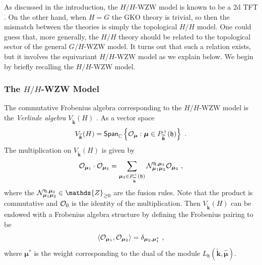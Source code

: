 \documentclass[a4paper,11pt]{article}
\newcommand{\bk}{\bm{k}}
\newcommand{\bmu}{\bm{\mu}}
\newcommand{\hbmu}{\hat{\bm{\mu}}}
\newcommand{\tsf}[1]{\textsf{#1}}
\newcommand{\wt}[1]{\widetilde{#1}}
\def\CN {{\cal N}}
\def\CO {{\cal O}}
\def\CO {{\cal O}}
\def\fh{\mathfrak{h}}
\begin{document}
As discussed in the introduction, the $H/H$-\tsf{WZW} model is known to be a 2d \tsf{TFT} 
\cite{SPIEGELGLAS199036,Spiegelglas:1991uc,Spiegelglas:1992jg,Witten:1991mm,Witten:1993xi}.
On the other hand, when $H=G$ the \tsf{GKO} theory is trivial, so then the mismatch between the 
theories is simply the topological $H/H$ model. 
%
%
One could guess that, more generally, the $H/H$ theory should be related to the  topological sector 
of the general $G/H$-\tsf{WZW} model. It turns out that such a relation exists, but it involves the equivariant $H/H$-\tsf{WZW} model as we explain below. We begin by briefly recalling the $H/H$-\tsf{WZW} model. 

\subsubsection{The $H/H$-\tsf{WZW} Model}

  The commutative Frobenius algebra corresponding to the $H/H$-\tsf{WZW} model is the \textit{Verlinde algebra} $V_{\wt\bk}(H)$ \cite{Witten:1993xi}. As a vector space
\begin{equation}
V_{\widetilde{\bk}}(H)=\mr{Span}_{\mathbb{C}}\left\{\CO_{\bmu}: \bmu \in P_{\widetilde{\bk}}^{+}(\fh)\right\}~.
\end{equation}
The multiplication on $V_{\widetilde{\bk}}(H)$ is given by
\begin{equation}\label{eq:prod_G/GTFT}
\CO_{\bmu_1} \cdot \CO_{\bmu_2}=\sum_{\bmu_3 \in P_{\wt{\bk}}^{+}(\fh)} \CN_{\bmu_1 \bmu_2}^{\fh, \bmu_3} \CO_{\bmu_3}~,
\end{equation}
where the $\CN_{\bmu_1 \bmu_2}^{\fh, \bmu_3} \in \mathds{Z}_{\geq 0}$ are the fusion rules. Note that the product is commutative and $\CO_0$ is the identity of the multiplication.  Then $V_{\wt{\bk}}(H)$ can be endowed with a Frobenius algebra structure by defining the Frobenius pairing to be
\begin{equation}\label{eq:frob_pair_H/H}
\left\langle\CO_{\bmu_1}, \CO_{\bmu_2}\right\rangle=\delta_{\bmu_2, \bmu_1^*}~,
\end{equation}
where $\bmu^*$ is the weight corresponding to the dual of the module $L_{\fh}(\wt{\bk},\hbmu)$. 
\end{document}
